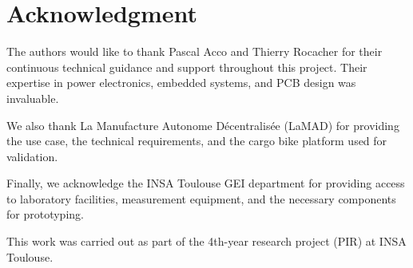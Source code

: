 \section*{Acknowledgment}
The authors would like to thank Pascal Acco and Thierry Rocacher for their continuous technical guidance and support throughout this project. Their expertise in power electronics, embedded systems, and PCB design was invaluable.

We also thank La Manufacture Autonome Décentralisée (LaMAD) for providing the use case, the technical requirements, and the cargo bike platform used for validation.

Finally, we acknowledge the INSA Toulouse GEI department for providing access to laboratory facilities, measurement equipment, and the necessary components for prototyping.

This work was carried out as part of the 4th-year research project (PIR) at INSA Toulouse.



